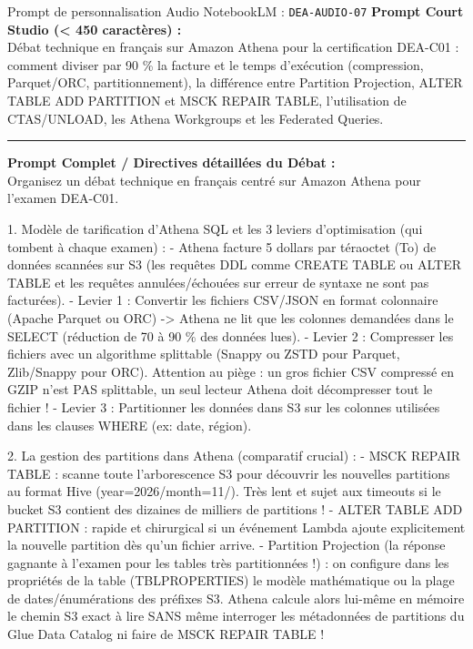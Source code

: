 \documentclass[11pt,a4paper]{article}
\begin{document}
\begin{promptbox}{Prompt de personnalisation Audio NotebookLM : \texttt{DEA-AUDIO-07}}
\textbf{Prompt Court Studio (< 450 caractères) :}\\
Débat technique en français sur Amazon Athena pour la certification DEA-C01 : comment diviser par 90 \% la facture et le temps d'exécution (compression, Parquet/ORC, partitionnement), la différence entre Partition Projection, ALTER TABLE ADD PARTITION et MSCK REPAIR TABLE, l'utilisation de CTAS/UNLOAD, les Athena Workgroups et les Federated Queries.

\medskip\hrule\medskip
\textbf{Prompt Complet / Directives détaillées du Débat :}\\
Organisez un débat technique en français centré sur Amazon Athena pour l'examen DEA-C01.

1. Modèle de tarification d'Athena SQL et les 3 leviers d'optimisation (qui tombent à chaque examen) :
- Athena facture 5 dollars par téraoctet (To) de données scannées sur S3 (les requêtes DDL comme CREATE TABLE ou ALTER TABLE et les requêtes annulées/échouées sur erreur de syntaxe ne sont pas facturées).
- Levier 1 : Convertir les fichiers CSV/JSON en format colonnaire (Apache Parquet ou ORC) -> Athena ne lit que les colonnes demandées dans le SELECT (réduction de 70 à 90 \% des données lues).
- Levier 2 : Compresser les fichiers avec un algorithme splittable (Snappy ou ZSTD pour Parquet, Zlib/Snappy pour ORC). Attention au piège : un gros fichier CSV compressé en GZIP n'est PAS splittable, un seul lecteur Athena doit décompresser tout le fichier !
- Levier 3 : Partitionner les données dans S3 sur les colonnes utilisées dans les clauses WHERE (ex: date, région).

2. La gestion des partitions dans Athena (comparatif crucial) :
- MSCK REPAIR TABLE : scanne toute l'arborescence S3 pour découvrir les nouvelles partitions au format Hive (year=2026/month=11/). Très lent et sujet aux timeouts si le bucket S3 contient des dizaines de milliers de partitions !
- ALTER TABLE ADD PARTITION : rapide et chirurgical si un événement Lambda ajoute explicitement la nouvelle partition dès qu'un fichier arrive.
- Partition Projection (la réponse gagnante à l'examen pour les tables très partitionnées !) : on configure dans les propriétés de la table (TBLPROPERTIES) le modèle mathématique ou la plage de dates/énumérations des préfixes S3. Athena calcule alors lui-même en mémoire le chemin S3 exact à lire SANS même interroger les métadonnées de partitions du Glue Data Catalog ni faire de MSCK REPAIR TABLE !


\end{promptbox}
\end{document}

